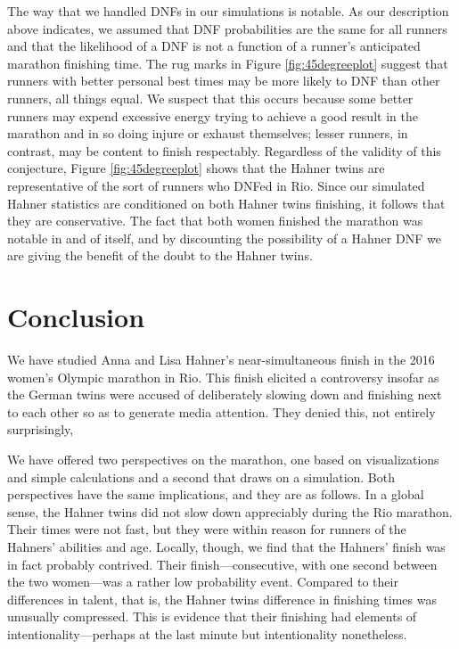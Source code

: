 \documentclass[12pt,titlepage]{article}
\begin{document}
The way that we handled DNFs in our simulations is notable. As our
description above indicates, we assumed that DNF probabilities are the
same for all runners and that the likelihood of a DNF is not a
function of a runner's anticipated marathon finishing time. The rug
marks in Figure \ref{fig:45degreeplot} suggest that runners with
better personal best times may be more likely to DNF than other
runners, all things equal. We suspect that this occurs because some
better runners may expend excessive energy trying to achieve a good
result in the marathon and in so doing injure or exhaust themselves;
lesser runners, in contrast, may be content to finish
respectably. Regardless of the validity of this conjecture, Figure
\ref{fig:45degreeplot} shows that the Hahner twins are representative
of the sort of runners who DNFed in Rio. Since our simulated Hahner
statistics are conditioned on both Hahner twins finishing, it follows
that they are conservative. The fact that both women finished the
marathon was notable in and of itself, and by discounting the
possibility of a Hahner DNF we are giving the benefit of the doubt to
the Hahner twins.

\section*{Conclusion}

We have studied Anna and Lisa Hahner's near-simultaneous finish in the
2016 women's Olympic marathon in Rio. This finish elicited a
controversy insofar as the German twins were accused of deliberately
slowing down and finishing next to each other so as to generate media
attention. They denied this, not entirely surprisingly,

We have offered two perspectives on the marathon, one based on
visualizations and simple calculations and a second that draws on a
simulation. Both perspectives have the same implications, and they are
as follows. In a global sense, the Hahner twins did not slow down
appreciably during the Rio marathon. Their times were not fast, but
they were within reason for runners of the Hahners' abilities and age.
Locally, though, we find that the Hahners' finish was in fact probably
contrived. Their finish---consecutive, with one second between the two
women---was a rather low probability event. Compared to their
differences in talent, that is, the Hahner twins difference in
finishing times was unusually compressed. This is evidence that their
finishing had elements of intentionality---perhaps at the last minute
but intentionality nonetheless.
\end{document}
